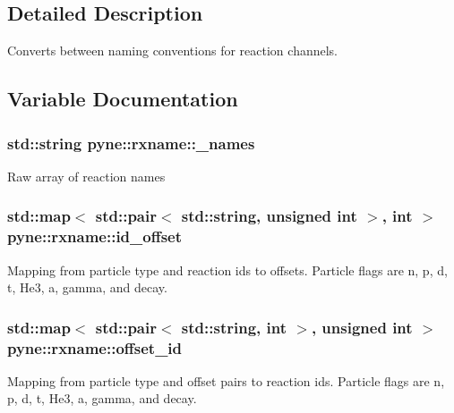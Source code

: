 \subsection{Detailed Description}
Converts between naming conventions for reaction channels. 

\subsection{Variable Documentation}
\subsubsection[{\texorpdfstring{\+\_\+names}{_names}}]{\setlength{\rightskip}{0pt plus 5cm}std\+::string pyne\+::rxname\+::\+\_\+names}\hypertarget{namespacepyne_1_1rxname_a880e1a059fe54b6fd425cc3319978555}{}\label{namespacepyne_1_1rxname_a880e1a059fe54b6fd425cc3319978555}
Raw array of reaction names 
\subsubsection[{\texorpdfstring{id\+\_\+offset}{id_offset}}]{\setlength{\rightskip}{0pt plus 5cm}std\+::map$<$ std\+::pair$<$ std\+::string, unsigned int $>$, int $>$ pyne\+::rxname\+::id\+\_\+offset}\hypertarget{namespacepyne_1_1rxname_ae2f5760c11dc39df3f90fbcc6584c95c}{}\label{namespacepyne_1_1rxname_ae2f5760c11dc39df3f90fbcc6584c95c}
Mapping from particle type and reaction ids to offsets. Particle flags are \textquotesingle{}n\textquotesingle{}, \textquotesingle{}p\textquotesingle{}, \textquotesingle{}d\textquotesingle{}, \textquotesingle{}t\textquotesingle{}, \textquotesingle{}He3\textquotesingle{}, \textquotesingle{}a\textquotesingle{}, \textquotesingle{}gamma\textquotesingle{}, and \textquotesingle{}decay\textquotesingle{}. 
\subsubsection[{\texorpdfstring{offset\+\_\+id}{offset_id}}]{\setlength{\rightskip}{0pt plus 5cm}std\+::map$<$ std\+::pair$<$ std\+::string, int $>$, unsigned int $>$ pyne\+::rxname\+::offset\+\_\+id}\hypertarget{namespacepyne_1_1rxname_a699be84310dad599582278e04135326e}{}\label{namespacepyne_1_1rxname_a699be84310dad599582278e04135326e}
Mapping from particle type and offset pairs to reaction ids. Particle flags are \textquotesingle{}n\textquotesingle{}, \textquotesingle{}p\textquotesingle{}, \textquotesingle{}d\textquotesingle{}, \textquotesingle{}t\textquotesingle{}, \textquotesingle{}He3\textquotesingle{}, \textquotesingle{}a\textquotesingle{}, \textquotesingle{}gamma\textquotesingle{}, and \textquotesingle{}decay\textquotesingle{}. 